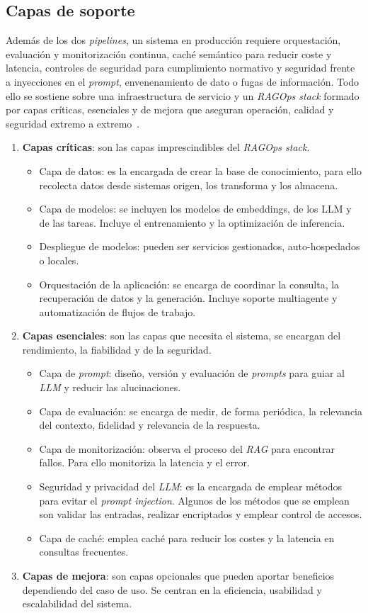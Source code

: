 \subsection{Capas de soporte}
Además de los dos \textit{pipelines}, un sistema en producción requiere orquestación, evaluación y monitorización continua, caché semántico para reducir coste y latencia, controles de seguridad para cumplimiento normativo y seguridad frente a inyecciones en el \textit{prompt}, envenenamiento de dato o fugas de información. Todo ello se sostiene sobre una infraestructura de servicio y un \textit{RAGOps stack} formado por capas críticas, esenciales y de mejora que aseguran operación, calidad y seguridad extremo a extremo~\cite{book:RAG_SimpleGuide}.
\begin{enumerate}
\tightlist
	\item \textbf{Capas críticas}: son las capas imprescindibles del \textit{RAGOps stack}.
	\begin{itemize}
	\tightlist
		\item Capa de datos: es la encargada de crear la base de conocimiento, para ello recolecta datos desde sistemas origen, los transforma y los almacena.
		\item Capa de modelos: se incluyen los modelos de embeddings, de los LLM y de las tareas. Incluye el entrenamiento y la optimización de inferencia.
		\item Despliegue de modelos: pueden ser servicios gestionados, auto-hospedados o locales.
		\item Orquestación de la aplicación: se encarga de coordinar la consulta, la recuperación de datos y la generación. Incluye soporte multiagente y automatización de flujos de trabajo. 
	\end{itemize}
	\item \textbf{Capas esenciales}: son las capas que necesita el sistema, se encargan del rendimiento, la fiabilidad y de la seguridad.
	\begin{itemize}
	\tightlist
		\item Capa de \textit{prompt}: diseño, versión y evaluación de \textit{prompts} para guiar al \textit{LLM} y reducir las alucinaciones. 
		\item Capa de evaluación: se encarga de medir, de forma periódica, la relevancia del contexto, fidelidad y relevancia de la respuesta.
		\item Capa de monitorización: observa el proceso del \textit{RAG} para encontrar fallos. Para ello monitoriza la latencia y el error.
		\item Seguridad y privacidad del \textit{LLM}: es la encargada de emplear métodos para evitar el \textit{prompt injection}. Algunos de los métodos que se emplean son validar las entradas, realizar encriptados y emplear control de accesos.
		\item Capa de caché: emplea caché para reducir los costes y la latencia en consultas frecuentes.
	\end{itemize}
	\item \textbf{Capas de mejora}: son capas opcionales que pueden aportar beneficios dependiendo del caso de uso. Se centran en la eficiencia, usabilidad y escalabilidad del sistema.
\end{enumerate}

